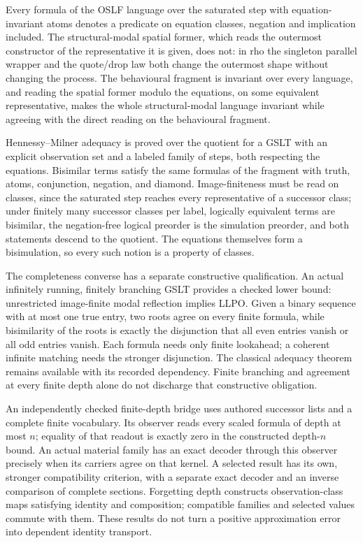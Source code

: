 \documentclass[11pt]{article}
\theoremstyle{definition}
\theoremstyle{remark}
\begin{document}
Every formula of the OSLF language over the saturated step with
equation-invariant atoms denotes a predicate on equation classes, negation
and implication included.  The structural-modal spatial former, which reads
the outermost constructor of the representative it is given, does not: in rho
the singleton parallel wrapper and the quote/drop law both change the
outermost shape without changing the process.  The behavioural fragment is
invariant over every language, and reading the spatial former modulo the
equations, on some equivalent representative, makes the whole
structural-modal language invariant while agreeing with the direct reading on
the behavioural fragment.

Hennessy--Milner adequacy is proved over the quotient for a GSLT with an
explicit observation set and a labeled family of steps, both respecting the
equations.  Bisimilar terms satisfy the same formulas of the fragment with
truth, atoms, conjunction, negation, and diamond.  Image-finiteness must be
read on classes, since the saturated step reaches every representative of a
successor class; under finitely many successor classes per label, logically
equivalent terms are bisimilar, the negation-free logical preorder is the
simulation preorder, and both statements descend to the quotient.  The
equations themselves form a bisimulation, so every such notion is a property
of classes.

The completeness converse has a separate constructive qualification.  An
actual infinitely running, finitely branching GSLT provides a checked lower
bound: unrestricted image-finite modal reflection implies LLPO.  Given a
binary sequence with at most one true entry, two roots agree on every finite
formula, while bisimilarity of the roots is exactly the disjunction that all
even entries vanish or all odd entries vanish.  Each formula needs only
finite lookahead; a coherent infinite matching needs the stronger
disjunction.  The classical adequacy theorem remains available with its
recorded dependency.  Finite branching and agreement at every finite depth
alone do not discharge that constructive obligation.

An independently checked finite-depth bridge uses authored successor lists
and a complete finite vocabulary.  Its observer reads every scaled formula
of depth at most $n$; equality of that readout is exactly zero in the
constructed depth-$n$ bound.  An actual material family has an exact decoder
through this observer precisely when its carriers agree on that kernel.
A selected result has its own, stronger compatibility criterion, with a
separate exact decoder and an inverse comparison of complete sections.
Forgetting depth constructs observation-class maps satisfying identity and
composition; compatible families and selected values commute with them.
These results do not turn a positive approximation error into dependent
identity transport.
\end{document}
